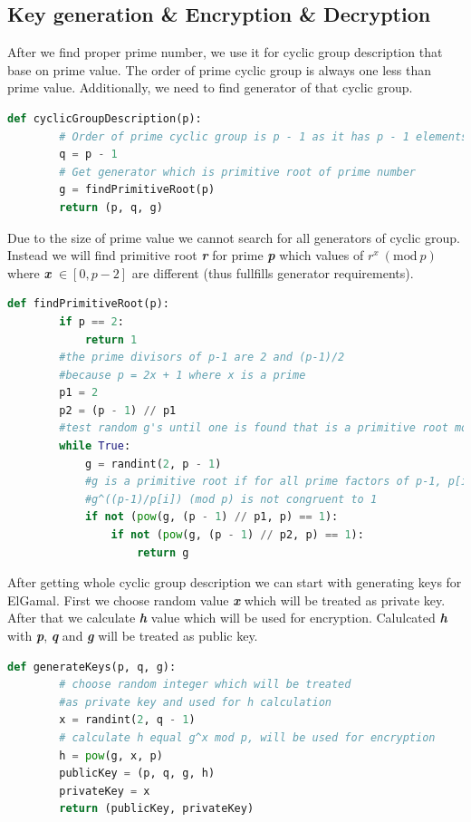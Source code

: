 \documentclass[a4paper,12pt]{article}
\newcommand{\Mod}[1]{\ (\mathrm{mod}\ #1)}
\begin{document}
\subsection{Key generation \& Encryption \& Decryption}
After we find proper prime number, we use it for cyclic group description that base on prime value. 
The order of prime cyclic group is always one less than prime value. Additionally, we need to find generator of that cyclic group. 
\begin{lstlisting}[language=Python]
    def cyclicGroupDescription(p):
        # Order of prime cyclic group is p - 1 as it has p - 1 elements in group
        q = p - 1
        # Get generator which is primitive root of prime number
        g = findPrimitiveRoot(p)
        return (p, q, g)
\end{lstlisting}
Due to the size of prime value we cannot search for all generators of cyclic group. 
Instead we will find primitive root \textbf{\textit{r}} for prime \textbf{\textit{p}} which values of $r^x \Mod p$ where \textbf{\textit{x}}  $\in [0, p-2]$ are different (thus fullfills generator requirements). 
\begin{lstlisting}[language=Python]
    def findPrimitiveRoot(p):
        if p == 2:
            return 1
        #the prime divisors of p-1 are 2 and (p-1)/2 
        #because p = 2x + 1 where x is a prime
        p1 = 2
        p2 = (p - 1) // p1
        #test random g's until one is found that is a primitive root mod p
        while True:
            g = randint(2, p - 1)
            #g is a primitive root if for all prime factors of p-1, p[i]
            #g^((p-1)/p[i]) (mod p) is not congruent to 1
            if not (pow(g, (p - 1) // p1, p) == 1):
                if not (pow(g, (p - 1) // p2, p) == 1):
                    return g
\end{lstlisting}
After getting whole cyclic group description we can start with generating keys for ElGamal. 
First we choose random value \textbf{\textit{x}} which will be treated as private key. 
After that we calculate \textbf{\textit{h}} value which will be used for encryption. 
Calulcated \textbf{\textit{h}} with \textbf{\textit{p}}, \textbf{\textit{q}} and \textbf{\textit{g}} will be treated as public key. 
\begin{lstlisting}[language=Python]
    def generateKeys(p, q, g):
        # choose random integer which will be treated 
        #as private key and used for h calculation 
        x = randint(2, q - 1) 
        # calculate h equal g^x mod p, will be used for encryption
        h = pow(g, x, p) 
        publicKey = (p, q, g, h)
        privateKey = x
        return (publicKey, privateKey)
\end{lstlisting} \newpage 
\end{document}

